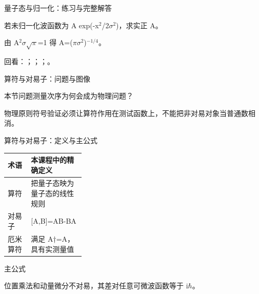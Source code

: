 \begin{frame}[t]{量子态与归一化：练习与完整解答}
\footnotesize
\begin{block}{}若未归一化波函数为 A exp(-x\ensuremath{^{2}}/\allowbreak{}2\ensuremath{\sigma}\ensuremath{^{2}})，求实正 A。\end{block}
\begin{exampleblock}{}由 A\ensuremath{^{2}}\ensuremath{\sigma}\ensuremath{\sqrt{\pi}}=1 得 A=(\ensuremath{\pi}\ensuremath{\sigma}\ensuremath{^{2}})\ensuremath{^{-1/4}}。\end{exampleblock}
\vfill
\scriptsize 回看：；；；。
\end{frame}

\begin{frame}[t]{算符与对易子：问题与图像}
\footnotesize
\begin{block}{本节问题}测量次序为何会成为物理问题？\end{block}
\begin{block}{物理原则}\quad 符号验证必须让算符作用在测试函数上，不能把非对易对象当普通数相消。\end{block}
\end{frame}

\begin{frame}[t]{算符与对易子：定义与主公式}
\footnotesize\begin{tabularx}{\linewidth}{p{0.30\linewidth}Y}
\toprule 术语 & 本课程中的精确定义\\\midrule
{} 算符 & 把量子态映为量子态的线性规则\\
 对易子 & [A,B]=AB-BA\\
 厄米算符 & 满足 A†=A，具有实测量值\\
\bottomrule\end{tabularx}\vspace{0.15cm}
\begin{block}{ 主公式}\centering{}\end{block}
位置乘法和动量微分不对易，其差对任意可微波函数等于 i\ensuremath{\hbar}。
\end{frame}

